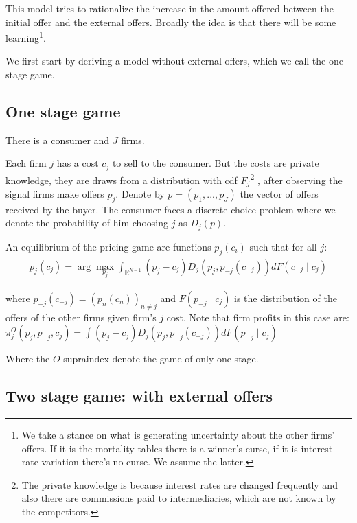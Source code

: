 \documentclass[12pt]{article}
\begin{document}
This model tries to rationalize the increase in the amount offered between the initial offer and the external offers. Broadly the idea is that there will be some learning\footnote{We take a stance on what is generating uncertainty about the other firms' offers. If it is the mortality tables there is a winner's curse, if it is interest rate variation there's no curse. We assume the latter. }. 

We first start by deriving a model without external offers, which we call the one stage game. 

\subsection{One stage game}
There is a consumer and $J$ firms. 

Each firm $j$ has a cost $c_j$ to sell to the consumer. But the costs are private knowledge, they are draws from a distribution with cdf $F_j$\footnote{The private knowledge is because interest rates are changed frequently and also there are commissions paid to intermediaries, which are not known by the competitors. 
} , after observing the signal firms make  offers $p_j$.  Denote by $p = (p_1, ..., p_J)$ the vector of offers received by the buyer.  The consumer faces a discrete choice problem where we denote the probability of him choosing $j$ as $D_j(p)$. 

An equilibrium of the pricing game are functions $p_j(c_i)$ such that for all $j$:
\begin{align}
\label{eq:base_equilibrium}
    p_j(c_j) = \arg \max_{p_j} \int_{\mathbb{R}^{N-1}}^{} (p_j - c_j) D_j(p_j, p_{-j}(c_{-j})) dF(c_{-j} \mid c_j)
\end{align} 

where $p_{-j}(c_{-j}) = (p_n(c_n))_{n \neq j}$ and $F(p_{-j} \mid c_j)$ is the distribution of the offers of the other firms given firm's $j$ cost. Note that firm profits in this case are: $\pi_j^{O}(p_j, p_{-j}, c_j) = \int (p_j - c_j) D_j(p_j, p_{-j}(c_{-j})) dF(p_{-j} \mid c_j)$

Where the $O$ supraindex denote the game of only one stage. 


\subsection{Two stage game:  with external offers}
\end{document}
